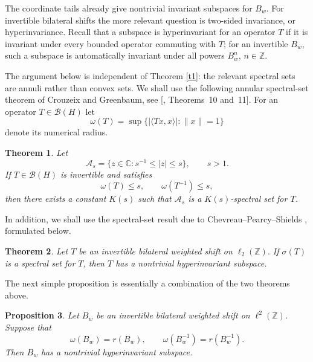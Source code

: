 \documentclass[11pt]{amsart}
\makeatletter
\numberwithin{equation}{section}
\newtheorem{theorem}{Theorem}[section]
\newtheorem{proposition}[theorem]{Proposition}
\theoremstyle{definition}
\theoremstyle{remark}
\newcommand{\loccite}[2]{[\@ifundefined{b@#2}{\textbf{??}}{\csname b@#2\endcsname}, #1]}
\newcommand{\BH}{\mathcal B(H)}
\makeatother
\begin{document}
The coordinate tails already give nontrivial invariant subspaces for $B_w$.
For invertible bilateral shifts the more relevant question is two-sided
invariance, or hyperinvariance. Recall that a subspace is hyperinvariant for
an operator $T$ if it is invariant under every bounded operator commuting with
$T$; for an invertible $B_w$, such a subspace is automatically invariant under
all powers $B_w^n$, $n\in\mathbb Z$.

The argument below is independent of Theorem \ref{t1}: the relevant spectral
sets are annuli rather than convex sets. We shall use the following annular
spectral-set theorem of Crouzeix and Greenbaum, see
\loccite{Theorems~10 and~11}{CG}. For an operator $T\in\BH$ let
\[
    \omega(T)=\sup\{|\langle Tx,x\rangle|:\|x\|=1\}
\]
denote its numerical radius.

\begin{theorem}\label{thm:annular-CG}
Let
\[
    \mathcal A_s=\{z\in\mathbb C:s^{-1}\le |z|\le s\},\qquad s>1.
\]
If $T\in \BH$ is invertible and satisfies
\[
    \omega(T)\le s,
    \qquad
    \omega(T^{-1})\le s,
\]
then there exists a constant $K(s)$ such that $\mathcal A_s$ is a
$K(s)$-spectral set for $T$.
\end{theorem}

In addition, we shall use the spectral-set result due to 
Chevreau--Pearcy--Shields \cite[Theorem 6.2]{CPS}, formulated below.
\begin{theorem}\label{thm:CPS-shift}
Let $T$ be an invertible bilateral weighted shift on $\ell_2(\mathbb Z).$ If $\sigma(T)$ is a
spectral set for $T$, then $T$ has a nontrivial hyperinvariant subspace.
\end{theorem}
The next simple proposition is essentially a combination of the two theorems above.
\begin{proposition}\label{prop:annular-hyperinvariant-shift}
Let $B_w$ be an invertible bilateral weighted shift on $\ell^2(\mathbb Z)$.
Suppose that
\[
    \omega(B_w)=r(B_w),\qquad \omega(B_w^{-1})=r(B_w^{-1}).
\]
Then $B_w$ has a nontrivial hyperinvariant subspace.
\end{proposition}
\end{document}
